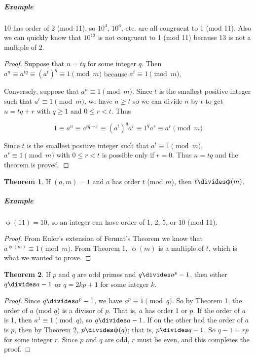 \documentclass{article}
\theoremstyle{definition} %
\newtheorem{theorem}{Theorem}[section] %
\theoremstyle{definition}
\theoremstyle{definition}
\newcommand{\tot}{\upphi}
\theoremstyle{definition}
\begin{document}
  \subparagraph{Example} 10 has order of 2 (mod 11), so $10^4$, $10^6$, etc. are all congruent to 1 (mod 11).
  Also we can quickly know that $10^{13}$ is not congruent to 1 (mod 11) because 13 is not a multiple of 2.
  
  \begin{proof}
    Suppose that $n = tq$ for some integer $q$. Then $a^n \equiv a^{tq} \equiv (a^t)^q \equiv 1 \pmod{m}$
    because $a^t \equiv 1 \pmod{m}$.
    
    Conversely, suppose that $a^n \equiv 1 \pmod{m}$. Since $t$ is the smallest positive integer such that
    $a^t \equiv 1 \pmod{m}$, we have $n \geq t$ so we can divide $n$ by $t$ to get $n = tq + r$ with
    $q \geq 1$ and $0 \leq r < t$. Thus
    
    \[ 1 \equiv a^n \equiv a^{tq + r} \equiv (a^t)^q a^r \equiv 1^q a^r \equiv a^r \pmod{m} \]
    
    Since $t$ is the smallest positive integer such that $a^t \equiv 1 \pmod{m}$, $a^r \equiv 1 \pmod{m}$
    with $0 \leq r < t$ is possible only if $r = 0$. Thus $n = tq$ and the theorem is proved.
  \end{proof}
  
  \begin{theorem}
    If $(a, m) = 1$ and $a$ has order $t$ (mod $m$), then $t \divides \tot(m)$.
  \end{theorem}
  
  \subparagraph{Example} $\tot(11) = 10$, so an integer can have order of 1, 2, 5, or 10 (mod 11).
  
  \begin{proof}
    From Euler's extension of Fermat's Theorem we know that $a^{\tot(m)} \equiv 1 \pmod{m}$. From
    Theorem 1, $\tot(m)$ is a multiple of $t$, which is what we wanted to prove.
  \end{proof}
  
  \begin{theorem}
    If $p$ and $q$ are odd primes and $q \divides a^p - 1$, then either $q \divides a - 1$ or $q = 2kp + 1$
    for some integer $k$.
  \end{theorem}
  
  \begin{proof}
    Since $q \divides a^p - 1$, we have $a^p \equiv 1 \pmod{q}$. So by Theorem 1, the order of $a$ (mod $q$)
    is a divisor of $p$. That is, $a$ has order 1 or $p$. If the order of $a$ is 1, then $a^1 \equiv 1 \pmod{q}$,
    so $q \divides a - 1$. If on the other had the order of $a$ is $p$, then by Theorem 2, $p \divides \tot(q)$;
    that is, $p \divides q - 1$. So $q - 1 = rp$ for some integer $r$. Since $p$ and $q$ are odd, $r$ must be even,
    and this completes the proof.
  \end{proof}
  
\end{document}
